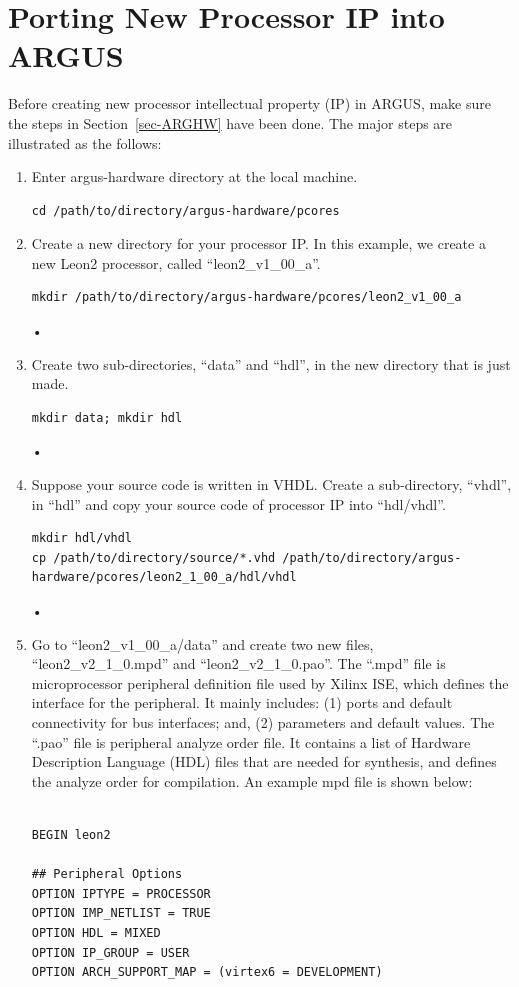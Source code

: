 \documentclass[a4paper,10pt]{article}
\begin{document}
\section{Porting New Processor IP into ARGUS}
Before creating new processor intellectual property (IP) in ARGUS, make sure the steps in Section~\ref{sec-ARGHW} have been done. The major steps are illustrated as the follows:
\begin{enumerate}
\item Enter argus-hardware directory at the local machine.
\begin{verbatim}
cd /path/to/directory/argus-hardware/pcores
\end{verbatim}
\item Create a new directory for your processor IP. In this example, we create a new Leon2 processor, called ``leon2\_v1\_00\_a''.
\begin{verbatim}
mkdir /path/to/directory/argus-hardware/pcores/leon2_v1_00_a
\end{verbatim}•
\item Create two sub-directories, ``data'' and ``hdl'', in the new directory that is just made. 
\begin{verbatim}
mkdir data; mkdir hdl
\end{verbatim}•
\item Suppose your source code is written in VHDL. Create a sub-directory, ``vhdl'', in ``hdl'' and copy your source code of processor IP into ``hdl/vhdl''.
\begin{verbatim}
mkdir hdl/vhdl
cp /path/to/directory/source/*.vhd /path/to/directory/argus-
hardware/pcores/leon2_1_00_a/hdl/vhdl
\end{verbatim}•
\item Go to ``leon2\_v1\_00\_a/data'' and create two new files, ``leon2\_v2\_1\_0.mpd'' and ``leon2\_v2\_1\_0.pao''. The ``.mpd'' file is microprocessor peripheral definition file used by Xilinx ISE, which defines the interface for the peripheral. It mainly includes: (1) ports and default connectivity for bus interfaces; and, (2) parameters and default values. The ``.pao'' file is peripheral analyze order file. It contains a list of Hardware Description Language (HDL) files that are needed for synthesis, and defines the analyze order for compilation. An example mpd file is shown below:
\small
\begin{verbatim}

BEGIN leon2

## Peripheral Options
OPTION IPTYPE = PROCESSOR
OPTION IMP_NETLIST = TRUE
OPTION HDL = MIXED
OPTION IP_GROUP = USER
OPTION ARCH_SUPPORT_MAP = (virtex6 = DEVELOPMENT)


\end{verbatim}
\end{enumerate}
\end{document}
